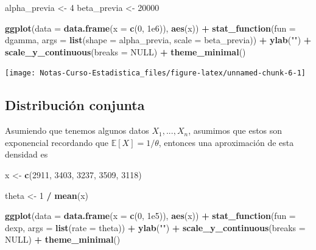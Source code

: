\documentclass[
  12pt,
]{book}
\newenvironment{Shaded}{\begin{snugshade}}{\end{snugshade}}
\newcommand{\DataTypeTok}[1]{\textcolor[rgb]{0.13,0.29,0.53}{#1}}
\newcommand{\DecValTok}[1]{\textcolor[rgb]{0.00,0.00,0.81}{#1}}
\newcommand{\FloatTok}[1]{\textcolor[rgb]{0.00,0.00,0.81}{#1}}
\newcommand{\KeywordTok}[1]{\textcolor[rgb]{0.13,0.29,0.53}{\textbf{#1}}}
\newcommand{\NormalTok}[1]{#1}
\newcommand{\OperatorTok}[1]{\textcolor[rgb]{0.81,0.36,0.00}{\textbf{#1}}}
\newcommand{\OtherTok}[1]{\textcolor[rgb]{0.56,0.35,0.01}{#1}}
\newcommand{\StringTok}[1]{\textcolor[rgb]{0.31,0.60,0.02}{#1}}
\begin{document}
\begin{Shaded}
\begin{Highlighting}[]
\NormalTok{alpha\_previa \textless{}{-}}\StringTok{ }\DecValTok{4}
\NormalTok{beta\_previa \textless{}{-}}\StringTok{ }\DecValTok{20000}

\KeywordTok{ggplot}\NormalTok{(}\DataTypeTok{data =} \KeywordTok{data.frame}\NormalTok{(}\DataTypeTok{x =} \KeywordTok{c}\NormalTok{(}\DecValTok{0}\NormalTok{, }\FloatTok{1e6}\NormalTok{)), }\KeywordTok{aes}\NormalTok{(x)) }\OperatorTok{+}
\StringTok{  }\KeywordTok{stat\_function}\NormalTok{(}\DataTypeTok{fun =}\NormalTok{ dgamma, }\DataTypeTok{args =} \KeywordTok{list}\NormalTok{(}\DataTypeTok{shape =}\NormalTok{ alpha\_previa, }\DataTypeTok{scale =}\NormalTok{ beta\_previa)) }\OperatorTok{+}
\StringTok{  }\KeywordTok{ylab}\NormalTok{(}\StringTok{""}\NormalTok{) }\OperatorTok{+}
\StringTok{  }\KeywordTok{scale\_y\_continuous}\NormalTok{(}\DataTypeTok{breaks =} \OtherTok{NULL}\NormalTok{) }\OperatorTok{+}
\StringTok{  }\KeywordTok{theme\_minimal}\NormalTok{()}
\end{Highlighting}
\end{Shaded}

\begin{center}\texttt{[image: Notas-Curso-Estadistica\_files/figure-latex/unnamed-chunk-6-1]} \end{center}

\hypertarget{distribuciuxf3n-conjunta}{%
\subsection{Distribución conjunta}\label{distribuciuxf3n-conjunta}}

Asumiendo que tenemos algunos datos \(X_1, ..., X_n\), asumimos que estos son exponencial recordando que \(\mathbb E [X] = 1/\theta\), entonces una aproximación de esta densidad es

\begin{Shaded}
\begin{Highlighting}[]
\NormalTok{x  \textless{}{-}}\StringTok{ }\KeywordTok{c}\NormalTok{(}\DecValTok{2911}\NormalTok{, }\DecValTok{3403}\NormalTok{, }\DecValTok{3237}\NormalTok{, }\DecValTok{3509}\NormalTok{, }\DecValTok{3118}\NormalTok{)}

\NormalTok{theta \textless{}{-}}\StringTok{ }\DecValTok{1} \OperatorTok{/}\StringTok{ }\KeywordTok{mean}\NormalTok{(x)}

\KeywordTok{ggplot}\NormalTok{(}\DataTypeTok{data =} \KeywordTok{data.frame}\NormalTok{(}\DataTypeTok{x =} \KeywordTok{c}\NormalTok{(}\DecValTok{0}\NormalTok{, }\FloatTok{1e5}\NormalTok{)), }\KeywordTok{aes}\NormalTok{(x)) }\OperatorTok{+}
\StringTok{  }\KeywordTok{stat\_function}\NormalTok{(}\DataTypeTok{fun =}\NormalTok{ dexp, }\DataTypeTok{args =} \KeywordTok{list}\NormalTok{(}\DataTypeTok{rate =}\NormalTok{ theta)) }\OperatorTok{+}
\StringTok{  }\KeywordTok{ylab}\NormalTok{(}\StringTok{""}\NormalTok{) }\OperatorTok{+}
\StringTok{  }\KeywordTok{scale\_y\_continuous}\NormalTok{(}\DataTypeTok{breaks =} \OtherTok{NULL}\NormalTok{) }\OperatorTok{+}
\StringTok{  }\KeywordTok{theme\_minimal}\NormalTok{()}
\end{Highlighting}
\end{Shaded}
\end{document}
